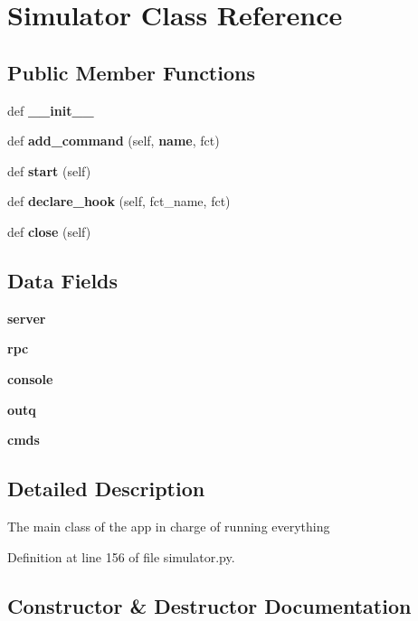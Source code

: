 \section{Simulator Class Reference}
\label{classmodbus__tk_1_1simulator_1_1_simulator}
\subsection*{Public Member Functions}
\begin{DoxyCompactItemize}
\item 
def {\bf \+\_\+\+\_\+init\+\_\+\+\_\+}
\item 
def {\bf add\+\_\+command} (self, {\bf name}, fct)
\item 
def {\bf start} (self)
\item 
def {\bf declare\+\_\+hook} (self, fct\+\_\+name, fct)
\item 
def {\bf close} (self)
\end{DoxyCompactItemize}
\subsection*{Data Fields}
\begin{DoxyCompactItemize}
\item 
{\bf server}
\item 
{\bf rpc}
\item 
{\bf console}
\item 
{\bf outq}
\item 
{\bf cmds}
\end{DoxyCompactItemize}


\subsection{Detailed Description}
\begin{DoxyVerb}The main class of the app in charge of running everything\end{DoxyVerb}
 

Definition at line 156 of file simulator.\+py.



\subsection{Constructor \& Destructor Documentation}
